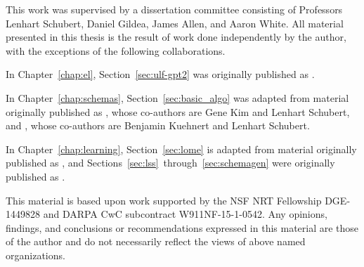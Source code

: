 \begin{contributors}

This work was supervised by a dissertation committee consisting of Professors Lenhart Schubert, Daniel Gildea, James Allen, and Aaron White.
All material presented in this thesis is the result of work done independently by the author, with the exceptions of the following collaborations.

In Chapter~\ref{chap:el}, Section~\ref{sec:ulf-gpt2} was originally published as \citet{gibson2022language}.

In Chapter~\ref{chap:schemas}, Section~\ref{sec:basic_algo} was adapted from material originally published as \citet{lawleykimschubert2019}, whose co-authors are Gene Kim and Lenhart Schubert, and \citet{Lawley2021LearningGE}, whose co-authors are Benjamin Kuehnert and Lenhart Schubert.

In Chapter~\ref{chap:learning}, Section~\ref{sec:lome} is adapted from material originally published as \citet{lomeproto}, and Sections~\ref{sec:lss}~through~\ref{sec:schemagen} were originally published as \citet{nesl}.

This material is based upon work supported by the NSF NRT Fellowship DGE-1449828 and DARPA CwC subcontract W911NF-15-1-0542.  Any opinions, findings, and conclusions or recommendations
expressed in this material are those of the author and do not necessarily reflect the views of above named organizations.
\end{contributors}